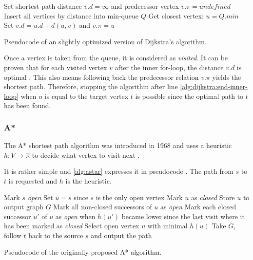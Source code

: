			\begin{algorithm}[h]
				\begin{algorithmic}[1]
						\State Set shortest path distance $v.d = \infty$ and predecessor vertex $v.\pi = undefined$
					\EndFor
					\State Insert all vertices by distance into min-queue $Q$
					\State
						\State Get closest vertex: $u = Q.min$
								\State Set $v.d = u.d + d(u, v)$ and $v.\pi = u$
							\EndIf
						\EndFor \label{alg:dijkstra:end-inner-loop}
					\EndWhile
				\end{algorithmic}
				\caption{Pseudocode of an slightly optimized version of Dijkstra's algorithm.}
				\label{alg:dijkstra}
			\end{algorithm}
		
			Once a vertex is taken from the queue, it is considered as \emph{visited}.
			It can be proven that for each visited vertex $v$ after the inner for-loop, the distance $v.d$ is optimal \cite[659-661]{cormen-introduction-to-alg}.
			This also means following back the predecessor relation $v.\pi$ yields the shortest path.
			Therefore, stopping the algorithm after line \ref{alg:dijkstra:end-inner-loop} when $u$ is equal to the target vertex $t$ is possible since the optimal path to $t$ has been found.
		
		\subsubsection{A*}
		\label{subsubsec:astar}
		
			The A* shortest path algorithm was introduced in 1968 and uses a heuristic $h : V \rightarrow \mathbb{R}$ to decide what vertex to visit next \cite[1]{astar}.
			
			It is rather simple and \cref{alg:astar} expresses it in pseudocode \cite[3]{astar}.
			The path from $s$ to $t$ is requested and $h$ is the heuristic.
			
			\begin{algorithm}[h]
				\begin{algorithmic}[1]
					\State Mark $s$ \emph{open}
					\State Set $u = s$ since $s$ is the only open vertex
						\State Mark $u$ as \emph{closed}
						\State Store $u$ to output graph $G$
						\State Mark all non-closed successors of $u$ as \emph{open}
						\State Mark each closed successor $u'$ of $u$ as \emph{open} when $h(u')$ became lower since the last visit where it has been marked as \emph{closed}
						\State Select open vertex $u$ with minimal $h(u)$
					\EndWhile
					\State Take $G$, follow $t$ back to the source $s$ and output the path
				\end{algorithmic}
				\caption{Pseudocode of the originally proposed A* algorithm.}
				\label{alg:astar}
			\end{algorithm}
		
